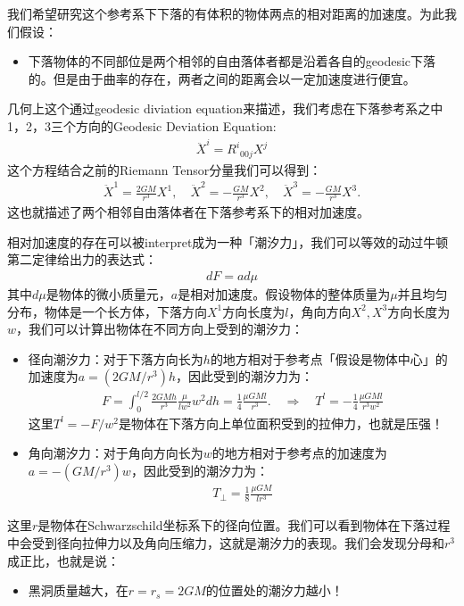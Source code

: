 \bigskip
{}

我们希望研究这个参考系下下落的有体积的物体两点的相对距离的加速度。为此我们假设：
\begin{itemize}
  \item 下落物体的不同部位是两个相邻的自由落体者都是沿着各自的geodesic下落的。但是由于曲率的存在，两者之间的距离会以一定加速度进行便宜。
\end{itemize}
几何上这个通过geodesic diviation equation来描述，我们考虑在下落参考系之中1，2，3三个方向的Geodesic
Deviation Equation:
\begin{align}
  \ddot{X}^i=R^i{}_{00j}X^j
\end{align}
这个方程结合之前的Riemann Tensor分量我们可以得到：
\begin{align}
  \ddot{X}^1=\frac{2GM}{r^3}X^1,\quad\ddot{X}^2=-\frac{GM}{r^3}X^2,\quad\ddot{X}^3=-\frac{GM}{r^3}X^3.
\end{align}
这也就描述了两个相邻自由落体者在下落参考系下的相对加速度。

\bigskip
{}

相对加速度的存在可以被interpret成为一种「潮汐力」，我们可以等效的动过牛顿第二定律给出力的表达式：
\begin{align}
  d F = a d \mu
\end{align}
其中$ d\mu $是物体的微小质量元，$ a $是相对加速度。假设物体的整体质量为$ \mu
$并且均匀分布，物体是一个长方体，下落方向$ X^1 $方向长度为$ l $，角向方向$ X^2,X^3 $方向长度为$ w
$，我们可以计算出物体在不同方向上受到的潮汐力：
\begin{itemize}
  \item 径向潮汐力：对于下落方向长为$ h $的地方相对于参考点「假设是物体中心」的加速度为$ a = (2GM/r^3)h $，因此受到的潮汐力为：
    \begin{align}
      F=\int_0^{l/2}\frac{2GMh}{r^3}\frac{\mu}{lw^2}w^2dh=\frac{1}{4}\frac{\mu
      GMl}{r^3}. \quad \Rightarrow \quad T^l=-\frac{1}{4}\frac{\mu GMl}{r^3w^2}
    \end{align}
    这里$ T^l = - F / w^2$是物体在下落方向上单位面积受到的拉伸力，也就是压强！
  \item 角向潮汐力：对于角向方向长为$ w $的地方相对于参考点的加速度为$ a = -(GM/r^3)w $，因此受到的潮汐力为：
    \begin{align}
      T_\perp=\frac{1}{8}\frac{\mu GM}{lr^3}
    \end{align}
\end{itemize}
这里$ r
$是物体在Schwarzschild坐标系下的径向位置。我们可以看到物体在下落过程中会受到径向拉伸力以及角向压缩力，这就是潮汐力的表现。我们会发现分母和$
r^3 $成正比，也就是说：
\begin{itemize}
  \item 黑洞质量越大，在$ r = r_s = 2GM $的位置处的潮汐力越小！
\end{itemize}


